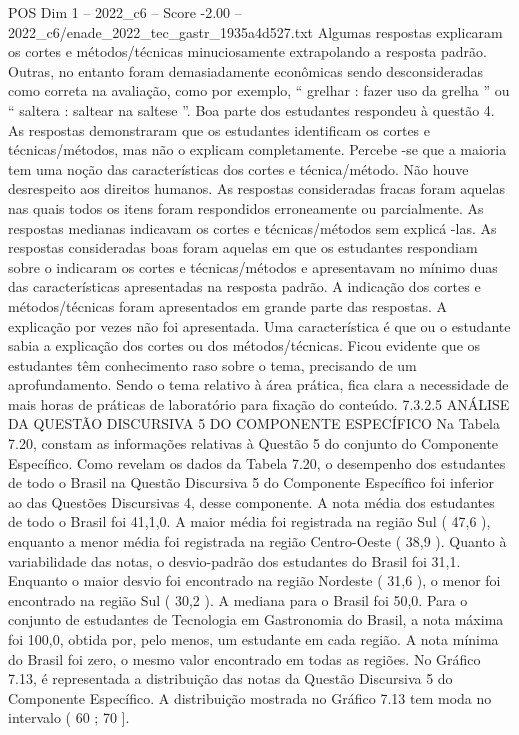 \begin{textsample}{POS Dim 1 – 2022\_c6 – Score -2.00 – 2022\_c6/enade\_2022\_tec\_gastr\_1935a4d527.txt}
Algumas respostas explicaram os cortes e métodos/técnicas minuciosamente extrapolando a resposta padrão.
Outras, no entanto foram demasiadamente econômicas sendo desconsideradas como correta na avaliação, como por exemplo, “ grelhar : fazer uso da grelha ” ou “ saltera : saltear na saltese ”.
Boa parte dos estudantes respondeu à questão 4.
As respostas demonstraram que os estudantes identificam os cortes e técnicas/métodos, mas não o explicam completamente.
Percebe -se que a maioria tem uma noção das características dos cortes e técnica/método.
Não houve desrespeito aos direitos humanos.
As respostas consideradas fracas foram aquelas nas quais todos os itens foram respondidos erroneamente ou parcialmente.
As respostas medianas indicavam os cortes e técnicas/métodos sem explicá -las.
As respostas consideradas boas foram aquelas em que os estudantes respondiam sobre o indicaram os cortes e técnicas/métodos e apresentavam no mínimo duas das características apresentadas na resposta padrão.
A indicação dos cortes e métodos/técnicas foram apresentados em grande parte das respostas.
A explicação por vezes não foi apresentada.
Uma característica é que ou o estudante sabia a explicação dos cortes ou dos métodos/técnicas.
Ficou evidente que os estudantes têm conhecimento raso sobre o tema, precisando de um aprofundamento.
Sendo o tema relativo à área prática, fica clara a necessidade de mais horas de práticas de laboratório para fixação do conteúdo. 7.3.2.5 ANÁLISE DA QUESTÃO DISCURSIVA 5 DO COMPONENTE ESPECÍFICO Na Tabela 7.20, constam as informações relativas à Questão 5 do conjunto do Componente Específico.
Como revelam os dados da Tabela 7.20, o desempenho dos estudantes de todo o Brasil na Questão Discursiva 5 do Componente Específico foi inferior ao das Questões Discursivas 4, desse componente.
A nota média dos estudantes de todo o Brasil foi 41,1,0.
A maior média foi registrada na região Sul ( 47,6 ), enquanto a menor média foi registrada na região Centro-Oeste ( 38,9 ).
Quanto à variabilidade das notas, o desvio-padrão dos estudantes do Brasil foi 31,1.
Enquanto o maior desvio foi encontrado na região Nordeste ( 31,6 ), o menor foi encontrado na região Sul ( 30,2 ).
A mediana para o Brasil foi 50,0.
Para o conjunto de estudantes de Tecnologia em Gastronomia do Brasil, a nota máxima foi 100,0, obtida por, pelo menos, um estudante em cada região.
A nota mínima do Brasil foi zero, o mesmo valor encontrado em todas as regiões.
No Gráfico 7.13, é representada a distribuição das notas da Questão Discursiva 5 do Componente Específico.
A distribuição mostrada no Gráfico 7.13 tem moda no intervalo ( 60 ; 70 ].

\end{textsample}
